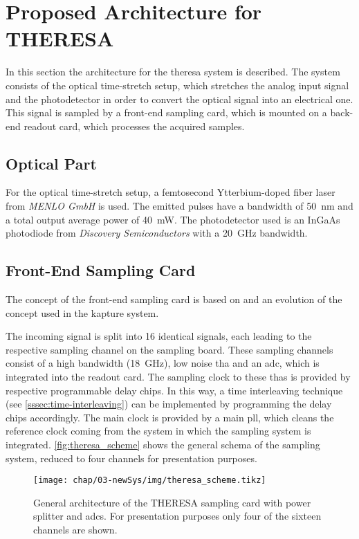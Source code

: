 \section{Proposed Architecture for THERESA}
In this section the architecture for the \gls{theresa} system is described.
The system consists of the optical time-stretch setup, which stretches the analog input signal and the photodetector in order to convert the optical signal into an electrical one.
This signal is sampled by a front-end sampling card, which is mounted on a back-end readout card, which processes the acquired samples.

\subsection*{Optical Part}
For the optical time-stretch setup, a femtosecond Ytterbium-doped fiber laser from \textit{MENLO GmbH} is used. The emitted pulses have a bandwidth of \SI{50}{\nano \meter} and a total output average power of \SI{40}{\milli \watt}.
The photodetector used is an InGaAs photodiode from \textit{Discovery Semiconductors} with a \SI{20}{\GHz} bandwidth.

\subsection{Front-End Sampling Card}
The concept of the front-end sampling card is based on and an evolution of the concept used in the \gls{kapture} system. 

The incoming signal is split into 16 identical signals, each leading to the respective sampling channel on the sampling board.
These sampling channels consist of a high bandwidth (\SI{18}{\GHz}), low noise \gls{tha} and an \gls{adc}, which is integrated into the readout card.
The sampling clock to these \glspl{tha} is provided by respective programmable delay chips.
In this way, a time interleaving technique (see \autoref{sssec:time-interleaving}) can be implemented by programming the delay chips accordingly. 
The main clock is provided by a main \gls{pll}, which cleans the reference clock coming from the system in which the sampling system is integrated.
\autoref{fig:theresa_scheme} shows the general schema of the sampling system, reduced to four channels for presentation purposes.
\begin{figure}[H]
	\centering
	\texttt{[image: chap/03-newSys/img/theresa\_scheme.tikz]}
	\caption[General architecture of the THERESA sampling card]{General architecture of the THERESA sampling card with power splitter and \glspl{adc}. For presentation purposes only four of the sixteen channels are shown.}
	\label{fig:theresa_scheme}
\end{figure}

